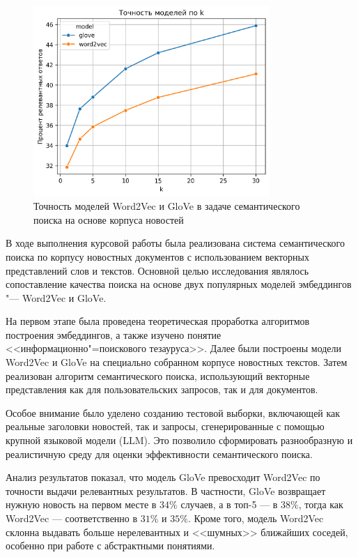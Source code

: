 \documentclass[coursework]{SCWorks}
\begin{document}
\begin{figure}[!ht]
    \centering
    \includegraphics[width=0.8\textwidth]{accuracy_by_model.png}
    \caption{Точность моделей Word2Vec и GloVe в задаче семантического поиска на основе корпуса новостей}
    \label{fig:search-analyse}
\end{figure}

\conclusion

В ходе выполнения курсовой работы была реализована система семантического поиска по корпусу новостных документов с использованием векторных представлений слов и текстов. Основной целью исследования являлось сопоставление качества поиска на основе двух популярных моделей эмбеддингов "--- Word2Vec и GloVe.

На первом этапе была проведена теоретическая проработка алгоритмов построения эмбеддингов, а также изучено понятие <<информационно"=поискового тезауруса>>. Далее были построены модели Word2Vec и GloVe на специально собранном корпусе новостных текстов. Затем реализован алгоритм семантического поиска, использующий векторные представления как для пользовательских запросов, так и для документов.

Особое внимание было уделено созданию тестовой выборки, включающей как реальные заголовки новостей, так и запросы, сгенерированные с помощью крупной языковой модели (LLM). Это позволило сформировать разнообразную и реалистичную среду для оценки эффективности семантического поиска.

Анализ результатов показал, что модель GloVe превосходит Word2Vec по точности выдачи релевантных результатов. В частности, GloVe возвращает нужную новость на первом месте в $34\%$ случаев, а в топ-5 — в $38\%$, тогда как Word2Vec — соответственно в $31\%$ и $35\%$. Кроме того, модель Word2Vec склонна выдавать больше нерелевантных и <<шумных>>  ближайших соседей, особенно при работе с абстрактными понятиями.
\end{document}
